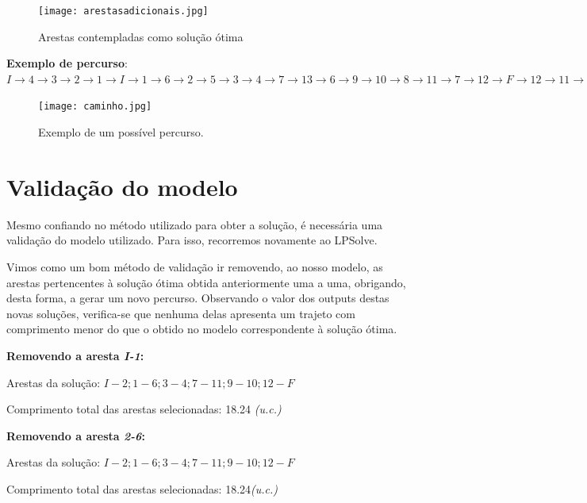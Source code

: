 \documentclass[runningheads]{llncs}
\begin{document}
    \begin{figure}[ht]
        \centering
        \texttt{[image: arestasadicionais.jpg]}
        \caption{Arestas contempladas como solução ótima}
        \label{fig:data8}
    \end{figure}

    \newpage


    \clearpage

    \textbf{Exemplo de percurso}:
    \newline $I \rightarrow 4 \rightarrow 3 \rightarrow 2 \rightarrow 1 \rightarrow I \rightarrow 1 \rightarrow 6 \rightarrow 2 \rightarrow 5 \rightarrow 3 \rightarrow 4 \rightarrow 7 \rightarrow 13 \rightarrow 6 \rightarrow 9 \rightarrow 10 \rightarrow 8 \rightarrow 11 \rightarrow 7 \rightarrow 12 \rightarrow F \rightarrow 12 \rightarrow 11 \rightarrow 10 \rightarrow 9 \rightarrow F$

    \begin{figure}[h]
        \centering
        \texttt{[image: caminho.jpg]}
        \caption{Exemplo de um possível percurso.}
        \label{fig:data9}
    \end{figure}

    \clearpage

    \section{Validação do modelo}
    Mesmo confiando no método utilizado para obter a solução, é necessária uma validação do modelo utilizado. Para isso, recorremos novamente ao LPSolve.

    Vimos como um bom método de validação ir removendo, ao nosso modelo, as arestas pertencentes à solução ótima obtida anteriormente uma a uma, obrigando, desta forma, a gerar um novo percurso. Observando o valor dos outputs destas novas soluções, verifica-se que nenhuma delas apresenta um trajeto com comprimento menor do que o obtido no modelo correspondente à solução ótima.

    \bigskip
    \textbf{Removendo a aresta \textit{I-1}:}

    Arestas da solução: $I-2; 1-6; 3-4; 7-11; 9-10; 12-F$

    Comprimento total das arestas selecionadas: 18.24 \textit{(u.c.)}

    \bigskip
    \textbf{Removendo a aresta \textit{2-6}:}

    Arestas da solução: $I-2; 1-6; 3-4; 7-11; 9-10; 12-F$

    Comprimento total das arestas selecionadas: 18.24\textit{(u.c.)}
\end{document}
